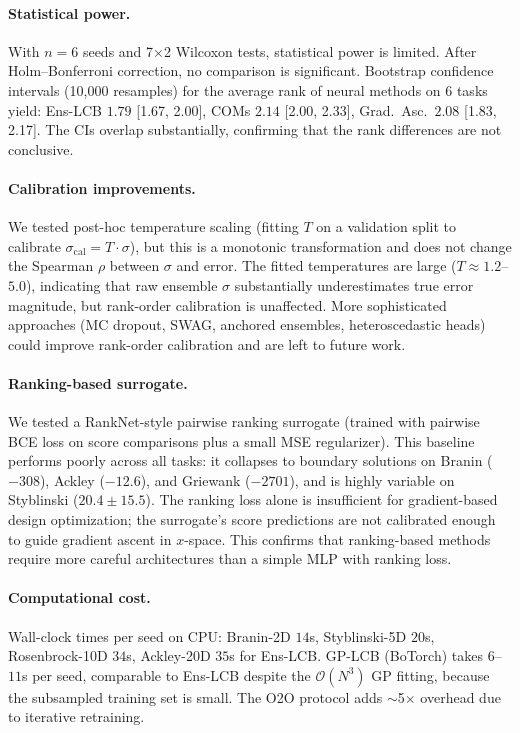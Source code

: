 \documentclass{article}
\theoremstyle{plain}
\theoremstyle{remark}
\newcommand{\method}{Ens-LCB}
\begin{document}
\paragraph{Statistical power.}
With $n{=}6$ seeds and 7$\times$2 Wilcoxon tests, statistical power is limited.
After Holm--Bonferroni correction, no comparison is significant.
Bootstrap confidence intervals (10{,}000 resamples) for the average rank of neural methods on 6 tasks yield: \method{} $1.79$ [1.67, 2.00], COMs $2.14$ [2.00, 2.33], Grad.\ Asc.\ $2.08$ [1.83, 2.17].
The CIs overlap substantially, confirming that the rank differences are not conclusive.

\paragraph{Calibration improvements.}
We tested post-hoc temperature scaling (fitting $T$ on a validation split to calibrate $\sigma_{\mathrm{cal}} = T \cdot \sigma$), but this is a monotonic transformation and does not change the Spearman $\rho$ between $\sigma$ and error.
The fitted temperatures are large ($T \approx 1.2$--$5.0$), indicating that raw ensemble $\sigma$ substantially underestimates true error magnitude, but rank-order calibration is unaffected.
More sophisticated approaches (MC dropout, SWAG, anchored ensembles, heteroscedastic heads) could improve rank-order calibration and are left to future work.

\paragraph{Ranking-based surrogate.}
We tested a RankNet-style pairwise ranking surrogate (trained with pairwise BCE loss on score comparisons plus a small MSE regularizer).
This baseline performs poorly across all tasks: it collapses to boundary solutions on Branin ($-308$), Ackley ($-12.6$), and Griewank ($-2701$), and is highly variable on Styblinski ($20.4 \pm 15.5$).
The ranking loss alone is insufficient for gradient-based design optimization; the surrogate's score predictions are not calibrated enough to guide gradient ascent in $x$-space.
This confirms that ranking-based methods require more careful architectures than a simple MLP with ranking loss.

\paragraph{Computational cost.}
Wall-clock times per seed on CPU: Branin-2D $14$s, Styblinski-5D $20$s, Rosenbrock-10D $34$s, Ackley-20D $35$s for \method{}.
GP-LCB (BoTorch) takes $6$--$11$s per seed, comparable to \method{} despite the $\mathcal{O}(N^3)$ GP fitting, because the subsampled training set is small.
The O2O protocol adds $\sim$5$\times$ overhead due to iterative retraining.
\end{document}

